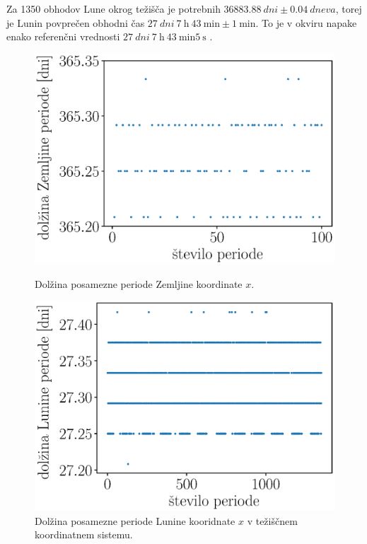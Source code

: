 \documentclass[a4paper,12pt]{article}
\begin{document}
Za 1350 obhodov Lune okrog težišča je potrebnih 
$\SI{36883.88}{dni}\pm\SI{0.04}{dneva}$, torej je Lunin povprečen obhodni čas
$\SI{27}{dni}\ \SI{7}{\hour}\ \SI{43}{\minute}\pm\SI{1}{\minute}$. To je v
okviru napake enako referenčni vrednosti
$\SI{27}{dni}\ \SI{7}{\hour}\ \SI{43}{\minute} \SI{5}{\second}$ \cite{nasassd}.

\begin{figure}[hb!]
    \centering
    \begin{minipage}[t]{.5\textwidth}
        \centering
        \includegraphics[scale=0.44]{slikep/obhodi-zemlja.eps}
        \begin{minipage}{0.8\textwidth}
            \caption{Dolžina posamezne periode Zemljine koordinate $x$.}
            \label{fig:period-comp1}
        \end{minipage}%
    \end{minipage}%
    \hfill
    \begin{minipage}[t]{.5\textwidth}
        \centering
        \includegraphics[scale=0.44]{slikep/obhodi-luna.eps}
        \begin{minipage}{0.9\textwidth}
            \caption{Dolžina posamezne periode Lunine kooridnate $x$ v
            težiščnem koordinatnem sistemu.}
            \label{fig:period-comp2}
        \end{minipage}
    \end{minipage}
\end{figure}
\end{document}
